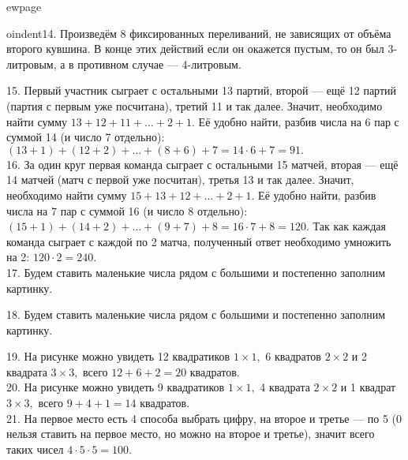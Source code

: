 ewpage

oindent14. Произведём 8 фиксированных переливаний, не зависящих от объёма второго кувшина. В конце этих действий если он окажется пустым, то он был 3-литровым, а в противном случае --- 4-литровым.
\begin{center}
\begin{figure}[h!]
\end{figure}
\end{center}
15. Первый участник сыграет с остальными 13 партий, второй --- ещё 12 партий (партия с первым уже посчитана), третий 11 и так далее. Значит, необходимо найти сумму $13+12+11+\ldots+2+1.$ Её удобно найти, разбив числа на 6 пар с суммой 14 (и число 7 отдельно): $(13+1)+(12+2)+\ldots+(8+6)+7=14\cdot6+7=91.$\\
16. За один круг первая команда сыграет с остальными 15 матчей, вторая --- ещё 14 матчей (матч с первой уже посчитан), третья 13 и так далее. Значит, необходимо найти сумму $15+13+12+\ldots+2+1.$ Её удобно найти, разбив числа на 7 пар с суммой 16 (и число 8 отдельно): $(15+1)+(14+2)+\ldots+(9+7)+8=16\cdot7+8=120.$ Так как каждая команда сыграет с каждой по 2 матча, полученный ответ необходимо умножить на 2: $120\cdot2=240.$\\
17. Будем ставить маленькие числа рядом с большими и постепенно заполним картинку.
\begin{center}
\begin{figure}[h!]
\end{figure}
\end{center}
18. Будем ставить маленькие числа рядом с большими и постепенно заполним картинку.
\begin{center}
\begin{figure}[h!]
\end{figure}
\end{center}
19. На рисунке можно увидеть 12 квадратиков $1\times1,$ 6 квадратов $2\times2$ и 2 квадрата $3\times3,$ всего $12+6+2=20$ квадратов.\\
20. На рисунке можно увидеть 9 квадратиков $1\times1,$ 4 квадрата $2\times2$ и 1 квадрат $3\times3,$ всего $9+4+1=14$ квадратов.\\
21. На первое место есть 4 способа выбрать цифру, на второе и третье --- по 5 (0 нельзя ставить на первое место, но можно на второе и третье), значит всего таких чисел $4\cdot5\cdot5=100.$\\
